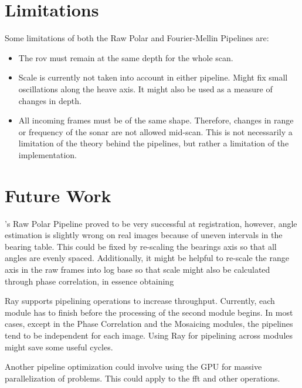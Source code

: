 \section{Limitations}

Some limitations of both the Raw Polar and Fourier-Mellin Pipelines are:

\begin{itemize}
    \item The \acrshort{rov} must remain at the same depth for the whole scan.
    \item Scale is currently not taken into account in either pipeline. Might fix small oscillations along the heave axis. It might also be used as a measure of changes in depth.
    \item All incoming frames must be of the same shape. Therefore, changes in range or frequency of the sonar are not allowed mid-scan. This is not necessarily a limitation of the theory behind the pipelines, but rather a limitation of the implementation.
\end{itemize}


\section{Future Work}

\citeauthor{Hurtos2015}'s Raw Polar Pipeline proved to be very successful at registration, however, angle estimation is slightly wrong on real images because of uneven intervals in the bearing table. This could be fixed by re-scaling the bearings axis so that all angles are evenly spaced. Additionally, it might be helpful to re-scale the range axis in the raw frames into log base so that scale might also be calculated through phase correlation, in essence obtaining 

Ray supports pipelining operations to increase throughput. Currently, each module has to finish before the processing of the second module begins. In most cases, except in the Phase Correlation and the Mosaicing modules, the pipelines tend to be independent for each image. Using Ray for pipelining across modules might save some useful cycles. 

Another pipeline optimization could involve using the GPU for massive parallelization of problems. This could apply to the \acrshort{fft} and other operations. 